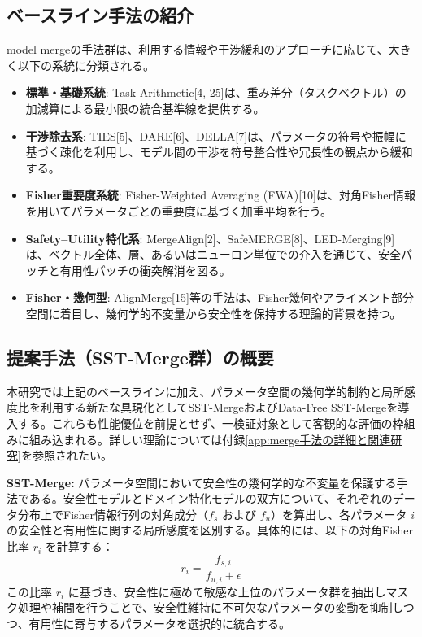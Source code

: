 \documentclass{article}
\begin{document}
\subsection{ベースライン手法の紹介}
model mergeの手法群は、利用する情報や干渉緩和のアプローチに応じて、大きく以下の系統に分類される。

\begin{itemize}
    \item \textbf{標準・基礎系統}: Task Arithmetic[4, 25]は、重み差分（タスクベクトル）の加減算による最小限の統合基準線を提供する。
    \item \textbf{干渉除去系}: TIES[5]、DARE[6]、DELLA[7]は、パラメータの符号や振幅に基づく疎化を利用し、モデル間の干渉を符号整合性や冗長性の観点から緩和する。
    \item \textbf{Fisher重要度系統}: Fisher-Weighted Averaging (FWA)[10]は、対角Fisher情報を用いてパラメータごとの重要度に基づく加重平均を行う。
    \item \textbf{Safety--Utility特化系}: MergeAlign[2]、SafeMERGE[8]、LED-Merging[9]は、ベクトル全体、層、あるいはニューロン単位での介入を通じて、安全パッチと有用性パッチの衝突解消を図る。
    \item \textbf{Fisher・幾何型}: AlignMerge[15]等の手法は、Fisher幾何やアライメント部分空間に着目し、幾何学的不変量から安全性を保持する理論的背景を持つ。
\end{itemize}

\subsection{提案手法（SST-Merge群）の概要}
本研究では上記のベースラインに加え、パラメータ空間の幾何学的制約と局所感度比を利用する新たな具現化としてSST-MergeおよびData-Free SST-Mergeを導入する。これらも性能優位を前提とせず、一検証対象として客観的な評価の枠組みに組み込まれる。詳しい理論については付録\ref{app:merge手法の詳細と関連研究}を参照されたい。

\textbf{SST-Merge:}
パラメータ空間において安全性の幾何学的な不変量を保護する手法である。安全性モデルとドメイン特化モデルの双方について、それぞれのデータ分布上でFisher情報行列の対角成分（$f_s$ および $f_u$）を算出し、各パラメータ $i$ の安全性と有用性に関する局所感度を区別する。具体的には、以下の対角Fisher比率 $r_i$ を計算する：
\[ r_i = \frac{f_{s,i}}{f_{u,i} + \epsilon} \]
この比率 $r_i$ に基づき、安全性に極めて敏感な上位のパラメータ群を抽出しマスク処理や補間を行うことで、安全性維持に不可欠なパラメータの変動を抑制しつつ、有用性に寄与するパラメータを選択的に統合する。
\end{document}
